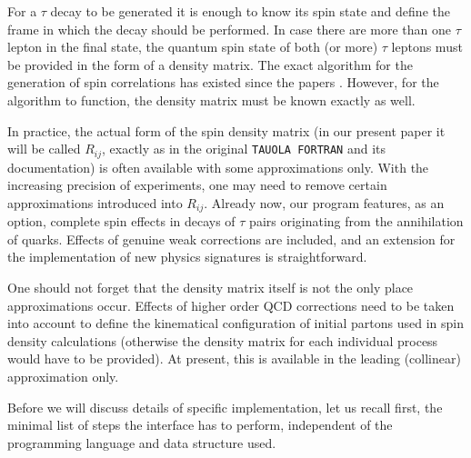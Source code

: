 \documentclass[]{Tauola_interface_design}
\begin{document}
For a $\tau$ decay to be generated it is enough to know its spin 
state and define the frame in which the decay should be performed. In case there are
more than one $\tau$ lepton in the final state, the quantum spin state of
both (or more) $\tau$ leptons must be provided in the form of a density matrix.
The exact  algorithm for the generation of spin correlations has existed 
since the papers \cite{Jadach:1990mz,Jezabek:1991qp,Jadach:1993hs}. 
However, for the algorithm to function, the density matrix must be known exactly as well.


In practice, the actual form of the spin density matrix 
(in our present paper it will be called $R_{ij}$, exactly as in the original 
{\tt TAUOLA FORTRAN} and its documentation) is often available  with some
approximations only.
With the increasing precision  of experiments,  
one may need to remove certain approximations introduced into $R_{ij}$.
Already now, our program  features, as an option,
complete spin effects in decays of $\tau$ pairs originating from the annihilation 
of quarks. Effects of genuine weak corrections are included, and an extension 
for the implementation of new physics signatures is straightforward. 
 
One should not forget that the density matrix itself is not the only place
approximations occur.  Effects of higher 
order QCD 
corrections need to be taken into account to define the kinematical configuration 
of initial partons 
used in spin density calculations (otherwise the density matrix for each individual 
process would have to be provided). At present, this is available in the 
 leading (collinear) approximation only.

Before we will discuss details of  specific implementation, let us recall 
first, the minimal list of steps the interface has to perform, independent 
of the programming language and data structure used.
\end{document}
